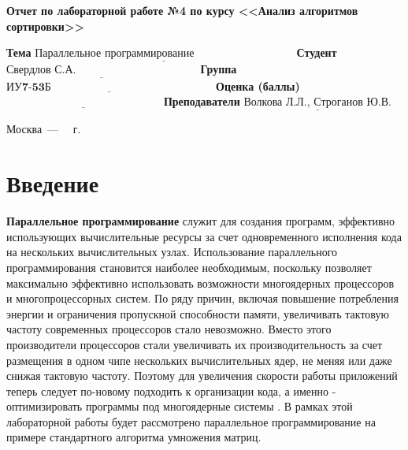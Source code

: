 \documentclass[12pt]{report}
\begin{document}
\begin{titlepage}
	
	\begin{center}
		\Large\textbf{Отчет по лабораторной работе №4 по курсу <<Анализ алгоритмов сортировки>>}
	\end{center}
	
	\noindent\textbf{Тема} $\underline{\textbf{Параллельное программирование~~~~~~~~~~~~~~~~~~~~~~~~~~~}}$\newline\newline\newline
	\noindent\textbf{Студент} $\underline{\textbf{Свердлов С.А.~~~~~~~~~~~~~~~~~~~~~~~~~~~~~~~~~}}$\newline\newline
	\noindent\textbf{Группа} $\underline{\textbf{ИУ7-53Б~~~~~~~~~~~~~~~~~~~~~~~~~~~~~~~~~~~~~~~~~~~~}}$\newline\newline
	\noindent\textbf{Оценка (баллы)} $\underline{\textbf{~~~~~~~~~~~~~~~~~~~~~~~~~~~~~~~~~~~~~~~~~~}}$\newline\newline
	\noindent\textbf{Преподаватели} $\underline{\textbf{Волкова Л.Л., Строганов Ю.В.}}$\newline
	
	\begin{center}
		\vfill
		Москва~---~\the\year
		~г.
	\end{center}
 \restoregeometry
\end{titlepage}

\setcounter{page}{2}

\tableofcontents

\newpage
\chapter*{Введение}

	\textbf{Параллельное программирование} служит для создания программ, эффективно использующих вычислительные ресурсы за счет одновременного исполнения кода на нескольких вычислительных узлах. Использование параллельного программирования становится наиболее необходимым, поскольку позволяет максимально эффективно использовать возможности многоядерных процессоров и многопроцессорных систем. По ряду причин, включая повышение потребления энергии и ограничения пропускной способности памяти, увеличивать тактовую частоту современных процессоров стало невозможно. Вместо этого производители процессоров стали увеличивать их производительность за счет размещения в одном чипе нескольких вычислительных ядер, не меняя или даже снижая тактовую частоту. Поэтому для увеличения скорости работы приложений теперь следует по-новому подходить к организации кода, а именно - оптимизировать программы под многоядерные системы \cite{MicrosoftPar}.
 В рамках этой лабораторной работы будет рассмотрено параллельное программирование на примере стандартного алгоритма умножения матриц.
\end{document}
